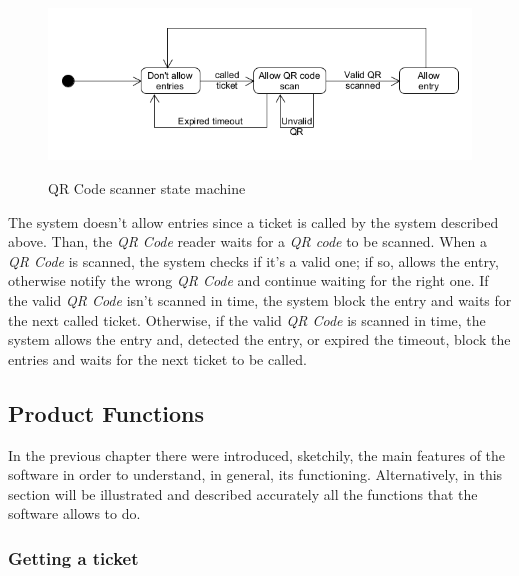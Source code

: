 \documentclass{article}
\begin{document}
		\bigskip
		
		\begin{figure}[!h]
			
			\centering
			\includegraphics[scale=0.52]{statechart2.PNG} \\
			\caption{QR Code scanner state machine}
			
		\end{figure}
		
		The system doesn't allow entries since a ticket is called by the system described above. Than, the \emph{QR Code} reader waits for a \emph{QR code} to be scanned. When a \emph{QR Code} is scanned, the system checks if it's a valid one; if so, allows the entry, otherwise notify the wrong \emph{QR Code} and continue waiting for the right one. If the valid \emph{QR Code} isn't scanned in time, the system block the entry and waits for the next called ticket. Otherwise, if the valid \emph{QR Code} is scanned in time, the system allows the entry and, detected the entry, or expired the timeout, block the entries and waits for the next ticket to be called.
	
	\subsection{Product Functions}
		
	In the previous chapter there were introduced, sketchily, the main features of the software in order to understand, in general, its functioning. Alternatively, in this section will be illustrated and described accurately all the functions that the software allows to do.
	
		\subsubsection{Getting a ticket}
		
\end{document}
